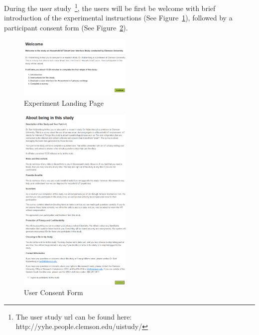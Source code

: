 During the user study~\footnote{The user study url can be found here: http://yyhe.people.clemson.edu/uistudy/}, the users will be first be welcome with brief introduction of the experimental instructions (See Figure~\ref{fig:us1}), followed by a participant consent form (See Figure~\ref{fig:us2}).

\begin{figure}
	\centering
	\includegraphics[width=0.48\textwidth]{figures/userstudy1.png}
	\caption{Experiment Landing Page}
	\label{fig:us1}
\end{figure}

\begin{figure}
	\centering
	\includegraphics[width=0.48\textwidth]{figures/userstudy2.png}
	\caption{User Consent Form}
	\label{fig:us2}
\end{figure}

